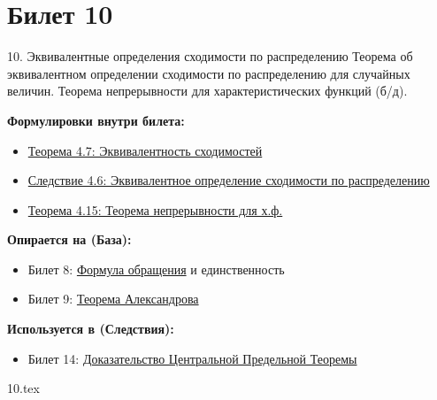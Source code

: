 \documentclass[a4paper, 12pt]{article}
\newcommand{\ticketsection}[1]{\vspace{0.5em}\noindent\textbf{\textcolor{ticketdark}{\sffamily #1}}\par}
\begin{document}
\section{Билет 10}
\begin{ticketskeleton}{10. Эквивалентные определения сходимости по распределению}
     Теорема об эквивалентном определении сходимости по распределению для случайных величин. Теорема непрерывности для характеристических функций (б/д).

    \ticketsection{Формулировки внутри билета:}
    \begin{itemize}
        \item \hyperref[thm:equiv_conv]{Теорема 4.7: Эквивалентность сходимостей}
        \item \hyperref[cor:equiv_dist]{Следствие 4.6: Эквивалентное определение сходимости по распределению}
        \item \hyperref[thm:continuity]{Теорема 4.15: Теорема непрерывности для х.ф.}
    \end{itemize}

    \ticketsection{Опирается на (База):}
    \begin{itemize}
        \item Билет 8: \hyperref[thm:inversion]{Формула обращения} и единственность
        \item Билет 9: \hyperref[thm:alexandrov]{Теорема Александрова}
    \end{itemize}

    \ticketsection{Используется в (Следствия):}
    \begin{itemize}
        \item Билет 14: \hyperref[thm:clt]{Доказательство Центральной Предельной Теоремы}
    \end{itemize}
\end{ticketskeleton}
{10.tex}
\end{document}
